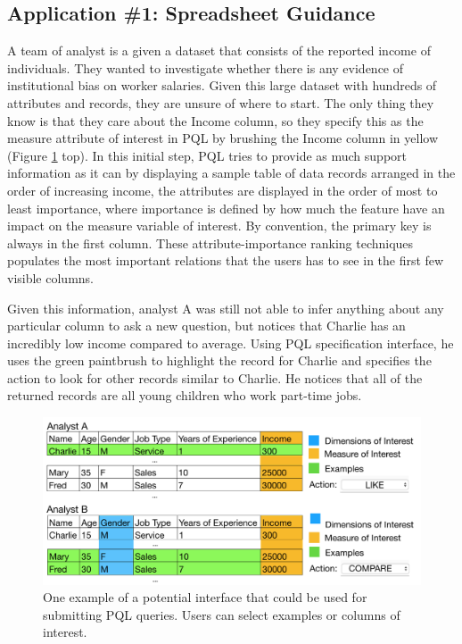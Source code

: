 \documentclass{sig-alternate-05-2015}
\begin{document}
\subsection{Application \#1: Spreadsheet Guidance}
\par A team of analyst is a given a dataset that consists of the reported income of individuals. They wanted to investigate whether there is any evidence of institutional bias on worker salaries. Given this large dataset with hundreds of attributes and records, they are unsure of where to start. The only thing they know is that they care about the Income column, so they specify this as the measure attribute of interest in PQL by brushing the Income column in yellow (Figure \ref{example} top). In this initial step, PQL tries to provide as much support information as it can by displaying a sample table of data records arranged in the order of increasing income, the attributes are displayed in the order of most to least importance, where importance is defined by how much the feature have an impact on the measure variable of interest. By convention, the primary key is always in the first column. These attribute-importance ranking techniques populates the most important relations that the users has to see in the first few visible columns.
\par Given this information, analyst A was still not able to infer anything about any particular column to ask a new question, but notices that Charlie has an incredibly low income compared to average. Using PQL specification interface, he uses the green paintbrush to highlight the record for Charlie and specifies the action to look for other records similar to Charlie. He notices that all of the returned records are all young children who work part-time jobs.
\begin{figure}[ht!]\label{example}
\includegraphics[width=\linewidth]{figures/example2.png}
\caption{One example of a potential interface that could be used for submitting PQL queries. Users can select examples or columns of interest. }
\end{figure}
\end{document}
